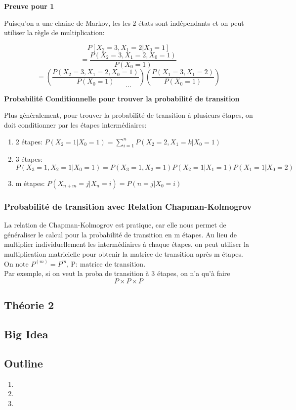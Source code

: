 \documentclass{article}
\begin{document}
\textbf{Preuve pour 1}

Puisqu'on a une chaine de Markov, les les 2 états sont indépendants et on peut
utiliser la règle de multiplication:

$$ P[X_2 = 3 , X_1 = 2 | X_0 = 1] $$
$$ = \frac{P(X_2 = 3, X_1 =2, X_0 = 1)}{P(X_0 = 1)}  $$
$$ = (\frac{P(X_2 = 3, X_1 =2, X_0 = 1)}{P(X_0 = 1)})
(\frac{P(X_1 = 3, X_1 = 2)}{P(X_0=1)} ) $$
$$ ... $$

\textbf{Probabilité Conditionnelle pour trouver la probabilité de transition}

Plus généralement, pour trouver la probabilité de transition à plusieurs
étapes, on doit conditionner par les étapes intermédiaires:

\begin{enumerate}
    \item 2 étapes: $ P(X_2 = 1 | X_0 =1) = \sum^{n}_{i=1} P(X_2 = 2, X_1 = k | X_0=1) $
    \item 3 étapes: $ P(X_3 = 1, X_2 = 1 | X_0 =1) = P(X_3 = 1, X_2 = 1)
	P(X_2 = 1 | X_1 =1) P(X_1 = 1 | X_0 =2)$
    \item m étapes: $ P(X_{n+m} = j | X_n = i) = P(n=j |X_0 = i) $
\end{enumerate}

\subsubsection{Probabilité de transition avec Relation Chapman-Kolmogrov}

La relation de Chapman-Kolmogrov est pratique, car elle nous permet de généraliser
le calcul pour la probabilité de transition en m étapes. Au lieu de multiplier
individuellement les intermédiaires à chaque étapes, on peut utiliser la
multiplication matricielle pour obtenir la matrice de transition après m
étapes. On note $ P^(m) = P^m $, P: matrice de transition.\\

Par exemple, si on veut la proba de transition à 3 étapes, on n'a qu'à faire
$$ P \times P \times P $$

\subsection{Théorie 2}
\subsection*{Big Idea}
\subsection*{Outline}
\begin{enumerate}
    \item
    \item
    \item
\end{enumerate}
\end{document}
